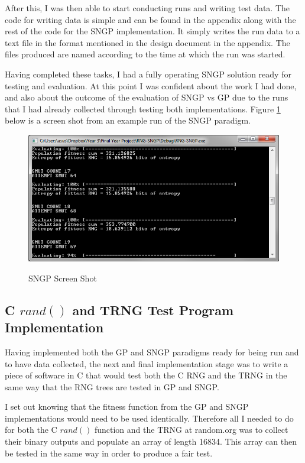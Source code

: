 \documentclass[a4paper,10.5pt]{article}
\begin{document}
After this, I was then able to start conducting runs and writing test data. The code for writing data is simple and can be found in the appendix along with the rest of the code for the SNGP implementation. It simply writes the run data to a text file in the format mentioned in the design document in the appendix. The files produced are named according to the time at which the run was started.

Having completed these tasks, I had a fully operating SNGP solution ready for testing and evaluation. At this point I was confident about the work I had done, and also about the outcome of the evaluation of SNGP vs GP due to the runs that I had already collected through testing both implementations. Figure \ref{sngpss} below is a screen shot from an example run of the SNGP paradigm.

\begin{figure}[H]
\centering
\caption{SNGP Screen Shot}
\includegraphics[scale = 0.75]{sngp-ss.png}
\label{sngpss}
\end{figure}

\subsection{C $rand()$ and TRNG Test Program Implementation}
Having implemented both the GP and SNGP paradigms ready for being run and to have data collected, the next and final implementation stage was to write a piece of software in C that would test both the C RNG and the TRNG in the same way that the RNG trees are tested in GP and SNGP.

I set out knowing that the fitness function from the GP and SNGP implementations would need to be used identically. Therefore all I needed to do for both the C $rand()$ function and the TRNG at random.org was to collect their binary outputs and populate an array of length 16834. This array can then be tested in the same way in order to produce a fair test.
\end{document}
